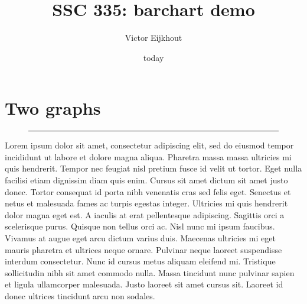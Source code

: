 \documentclass{artikel3}
\begin{document}
\title{SSC 335: barchart demo}
\author{Victor Eijkhout}
\date{today}
\maketitle

\section{Two graphs}

\begin{wrapfigure}{l}{2in}
  \hrule width 3in height 0pt
\end{wrapfigure}
Lorem ipsum dolor sit amet, consectetur adipiscing elit, sed do eiusmod tempor incididunt ut labore et dolore magna aliqua. Pharetra massa massa ultricies mi quis hendrerit. Tempor nec feugiat nisl pretium fusce id velit ut tortor. Eget nulla facilisi etiam dignissim diam quis enim. Cursus sit amet dictum sit amet justo donec. Tortor consequat id porta nibh venenatis cras sed felis eget. Senectus et netus et malesuada fames ac turpis egestas integer. Ultricies mi quis hendrerit dolor magna eget est. A iaculis at erat pellentesque adipiscing. Sagittis orci a scelerisque purus. Quisque non tellus orci ac. Nisl nunc mi ipsum faucibus. Vivamus at augue eget arcu dictum varius duis. Maecenas ultricies mi eget mauris pharetra et ultrices neque ornare. Pulvinar neque laoreet suspendisse interdum consectetur. Nunc id cursus metus aliquam eleifend mi. Tristique sollicitudin nibh sit amet commodo nulla. Massa tincidunt nunc pulvinar sapien et ligula ullamcorper malesuada. Justo laoreet sit amet cursus sit. Laoreet id donec ultrices tincidunt arcu non sodales.
\end{document}
